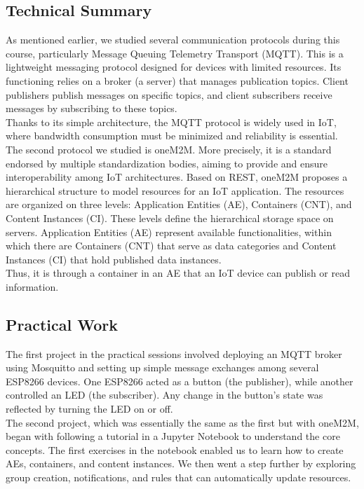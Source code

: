 \subsection{Technical Summary}
As mentioned earlier, we studied several communication protocols during this course, particularly Message Queuing Telemetry Transport (MQTT). This is a lightweight messaging protocol designed for devices with limited resources. Its functioning relies on a broker (a server) that manages publication topics. Client publishers publish messages on specific topics, and client subscribers receive messages by subscribing to these topics.\\

Thanks to its simple architecture, the MQTT protocol is widely used in IoT, where bandwidth consumption must be minimized and reliability is essential.\\

The second protocol we studied is oneM2M. More precisely, it is a standard endorsed by multiple standardization bodies, aiming to provide and ensure interoperability among IoT architectures. Based on REST, oneM2M proposes a hierarchical structure to model resources for an IoT application. The resources are organized on three levels: Application Entities (AE), Containers (CNT), and Content Instances (CI). These levels define the hierarchical storage space on servers. Application Entities (AE) represent available functionalities, within which there are Containers (CNT) that serve as data categories and Content Instances (CI) that hold published data instances.\\

Thus, it is through a container in an AE that an IoT device can publish or read information.

\subsection{Practical Work}
The first project in the practical sessions involved deploying an MQTT broker using Mosquitto and setting up simple message exchanges among several ESP8266 devices. One ESP8266 acted as a button (the publisher), while another controlled an LED (the subscriber). Any change in the button’s state was reflected by turning the LED on or off.\\

The second project, which was essentially the same as the first but with oneM2M, began with following a tutorial in a Jupyter Notebook to understand the core concepts. The first exercises in the notebook enabled us to learn how to create AEs, containers, and content instances. We then went a step further by exploring group creation, notifications, and rules that can automatically update resources.\\

